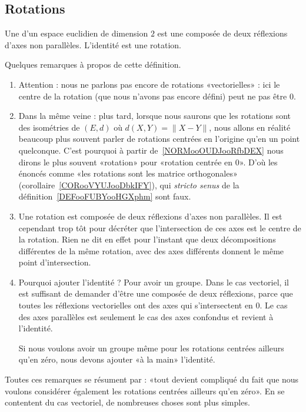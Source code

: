 \subsection{Rotations}

\begin{definition}        \label{DEFooFUBYooHGXphm}
    Une  d'un espace euclidien de dimension \( 2\) est une composée de deux réflexions d'axes non parallèles. L'identité est une rotation.
\end{definition}

\begin{normaltext}
    Quelques remarques à propos de cette définition.
    \begin{enumerate}
        \item
            Attention : nous ne parlons pas encore de rotations «vectorielles» : ici le centre de la rotation (que nous n'avons pas encore défini) peut ne pas être \( 0\).
        \item
            Dans la même veine : plus tard, lorsque nous saurons que les rotations sont des isométries de \( (E,d)\) où \( d(X,Y)=\| X-Y \|\), nous allons en réalité beaucoup plus souvent parler de rotations centrées en l'origine qu'en un point quelconque. C'est pourquoi à partir de~\ref{NORMooOUDJooRfbDEX} nous dirons le plus souvent «rotation»  pour «rotation centrée en \( 0\)». D'où les énoncés comme «les rotations sont les matrice orthogonales» (corollaire~\ref{CORooVYUJooDbkIFY}), qui \emph{stricto senus} de la définition~\ref{DEFooFUBYooHGXphm} sont faux.
        \item
            Une rotation est composée de deux réflexions d'axes non parallèles. Il est cependant trop tôt pour décréter que l'intersection de ces axes est le centre de la rotation. Rien ne dit en effet pour l'instant que deux décompositions différentes de la même rotation, avec des axes différents donnent le même point d'intersection.
        \item
            Pourquoi ajouter l'identité  ? Pour avoir un groupe. Dans le cas vectoriel, il est suffisant de demander d'être une composée de deux réflexions, parce que toutes les réflexions vectorielles ont des axes qui s'intersectent en \( 0\). Le cas des axes parallèles est seulement le cas des axes confondus et revient à l'identité.

            Si nous voulons avoir un groupe même pour les rotations centrées ailleurs qu'en zéro, nous devons ajouter «à la main» l'identité.
    \end{enumerate}

    Toutes ces remarques se résument par : «tout devient compliqué du fait que nous voulons considérer également les rotations centrées ailleurs qu'en zéro». En se contentent du cas vectoriel, de nombreuses choses sont plus simples.
\end{normaltext}

